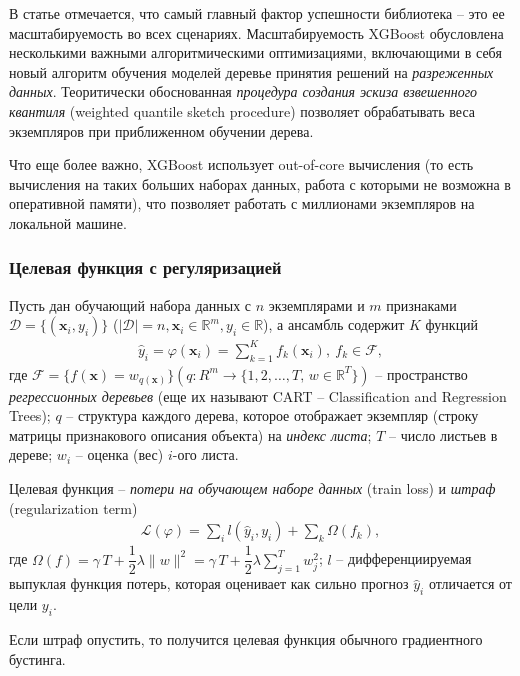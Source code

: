 \documentclass[%
	11pt,
	a4paper,
	utf8,
		]{article}
\begin{document}
В статье отмечается, что самый главный фактор успешности библиотека -- это ее масштабируемость во всех сценариях. Масштабируемость XGBoost обусловлена несколькими важными алгоритмическими оптимизациями, включающими в себя новый алгоритм обучения моделей деревье принятия решений на \emph{разреженных данных}. Теоритически обоснованная \emph{процедура создания эскиза взвешенного квантиля} (weighted quantile sketch procedure) позволяет обрабатывать веса экземпляров при приближенном обучении дерева.

Что еще более важно, XGBoost использует out-of-core вычисления (то есть вычисления на таких больших наборах данных, работа с которыми не возможна в оперативной памяти), что позволяет работать с миллионами экземпляров на локальной машине.

\subsubsection{Целевая функция с регуляризацией}

Пусть дан обучающий набора данных с $ n $ экземплярами и $ m $ признаками $ \mathcal{D} = \{(\mathbf{x}_i, y_i)\} $ ($ | \mathcal{D}| = n, \mathbf{x}_i \in \mathbb{R}^m, y_i \in \mathbb{R} $), а ансамбль содержит $ K $ функций 
\begin{align*}
	\hat{y}_i = \varphi(\mathbf{x}_i) = \sum_{k=1}^K f_k(\mathbf{x}_i), \ f_k \in \mathcal{F},
\end{align*}
где $ \mathcal{F} = \{ f(\mathbf{x}) = w_{ q(\mathbf{x}) } \} (q: R^m \rightarrow \{ 1, 2, \ldots, T, \, w \in \mathbb{R}^T \})$ -- пространство \emph{регрессионных деревьев} (еще их называют CART -- Classification and Regression Trees); $ q $ -- структура каждого дерева, которое отображает экземпляр (строку матрицы признакового описания объекта) на \emph{индекс листа}; $ T $ -- число листьев в дереве; $ w_i $ -- оценка (вес) $ i $-ого листа.

Целевая функция -- \emph{потери на обучающем наборе данных} (train loss) и \emph{штраф} (regularization term)
\begin{align}\label{eq:reg_obj}
	\mathcal{L}(\varphi) = \sum_i l(\hat{y}_i, y_i) + \sum_k \Omega (f_k),
\end{align}
где $ \Omega(f) = \gamma \, T + \dfrac{1}{2} \lambda \| w \|^2 = \gamma \, T + \dfrac{1}{2} \lambda \sum\limits_{j=1}^T w_j^2 $; $ l $ -- дифференциируемая выпуклая функция потерь, которая оценивает как сильно прогноз $ \hat{y}_i $ отличается от цели $ y_i $.

Если штраф опустить, то получится целевая функция обычного градиентного бустинга.
\end{document}
